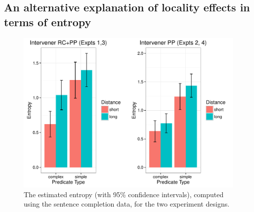 \documentclass{frontiersSCNS}\usepackage{knitr} %
\begin{document}
\subsection{An alternative explanation of locality effects in terms of entropy}




\begin{figure}[!htbp]
\begin{center}
\begin{knitrout}
\color{fgcolor}

{\centering \includegraphics[width=\maxwidth]{Figures/SafaviEtAlfigureentropyplot-1} 

}



\end{knitrout}
\caption{The estimated entropy (with 95\% confidence intervals), computed using the sentence completion data, for the two experiment designs.}\label{fig:entropy}
\end{center}
\end{figure}
\end{document}
